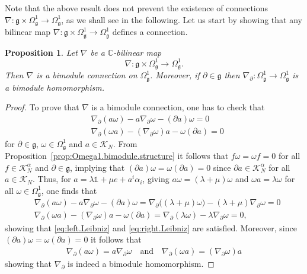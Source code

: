 \documentclass{amsart}
\newcommand{\complex}{\mathbb{C}}
\newcommand{\paraa}[1]{\big(#1\big)}
\newtheorem{proposition}[theorem]{Proposition}
\theoremstyle{definition}
\theoremstyle{remark}
\numberwithin{equation}{section}
\newcommand{\K}{\mathcal{K}}
\renewcommand{\mid}{\mathds{1}}
\newcommand{\KN}{\K_N}
\newcommand{\KaN}{\K^\alpha_N}
\renewcommand{\d}{\partial}
\newcommand{\qand}{\quad\text{and}\quad}
\newcommand{\g}{\mathfrak{g}}
\newcommand{\Omegaoneg}{\Omega^1_{\g}}
\begin{document}
\noindent
Note that the above result does not prevent the existence of
connections $\nabla:\g\times\Omegaoneg\to\Omegaoneg$, as we shall see
in the following. Let us start by showing that any bilinear map
$\nabla:\g\times\Omegaoneg\to\Omegaoneg$ defines a connection.

\begin{proposition}\label{prop:C.linear.gives.connection}
  Let $\nabla$ be a $\complex$-bilinear map
  \begin{equation*}
    \nabla:\g\times\Omegaoneg\to\Omegaoneg.
  \end{equation*}
  Then $\nabla$ is a bimodule connection on $\Omegaoneg$. Moreover, if
  $\d\in\g$ then $\nabla_{\d}:\Omegaoneg\to\Omegaoneg$ is a bimodule
  homomorphism.
\end{proposition}

\begin{proof}
  To prove that $\nabla$ is a bimodule connection, one has to check that
  \begin{align}
    &\nabla_{\d}(a\omega) - a\nabla_{\d}\omega - (\d a)\omega = 0\label{eq:left.Leibniz}\\
    &\nabla_{\d}(\omega a) - (\nabla_{\d}\omega)a - \omega(\d a) = 0\label{eq:right.Leibniz}
  \end{align}
  for $\d\in\g$, $\omega\in\Omegaoneg$ and $a\in\KN$.  From
  Proposition~\ref{prop:Omega1.bimodule.structure} it follows that
  $f\omega=\omega f=0$ for all $f\in\KaN$ and $\d\in\g$, implying that
  $(\d a)\omega=\omega(\d a)=0$ since $\d a\in\KaN$ for all
  $a\in\KN$. Thus, for $a=\lambda\mid + \mu e+a^i\alpha_i$, giving
  $a\omega=(\lambda+\mu)\omega$ and $\omega a=\lambda\omega$ for all
  $\omega\in\Omegaoneg$, one finds that
  \begin{align*}
    &\nabla_{\d}(a\omega) - a\nabla_{\d}\omega - (\d a)\omega
    = \nabla_{\d}\paraa{(\lambda+\mu)\omega}
    -(\lambda+\mu)\nabla_{\d}\omega = 0\\
    &\nabla_{\d}(\omega a) - (\nabla_{\d}\omega)a - \omega(\d a)
    = \nabla_{\d}(\lambda\omega)
    -\lambda\nabla_{\d}\omega = 0,
  \end{align*}
  showing that \eqref{eq:left.Leibniz} and \eqref{eq:right.Leibniz}
  are satisfied. Moreover, since $(\d a)\omega=\omega(\d a)=0$ it
  follows that
  \begin{align*}
    \nabla_{\d}(a\omega) = a\nabla_{\d}\omega\qand
    \nabla_{\d}(\omega a) = (\nabla_{\d}\omega)a
  \end{align*}
  showing that $\nabla_{\d}$ is indeed a bimodule homomorphism.
\end{proof}
\end{document}
